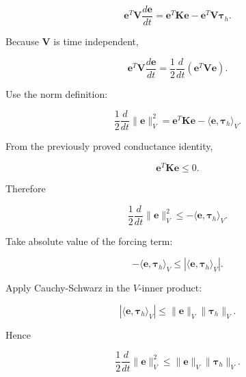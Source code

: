 \documentclass[11pt,a4paper]{article}
\begin{document}
\begin{equation}
\mathbf e^T\mathbf V
\frac{d\mathbf e}{dt}
=
\mathbf e^T\mathbf K\mathbf e
-
\mathbf e^T\mathbf V\boldsymbol\tau_h.
\tag{TRISO-ACC-272}
\label{eq:triso-acc-272}
\end{equation}

Because $\mathbf V$ is time independent,

\begin{equation}
\mathbf e^T\mathbf V
\frac{d\mathbf e}{dt}
=
\frac12
\frac{d}{dt}
\left(
\mathbf e^T\mathbf V\mathbf e
\right).
\tag{TRISO-ACC-273}
\label{eq:triso-acc-273}
\end{equation}

Use the norm definition:

\begin{equation}
\boxed{
\frac12
\frac{d}{dt}
\|\mathbf e\|_V^2
=
\mathbf e^T\mathbf K\mathbf e
-
\langle\mathbf e,\boldsymbol\tau_h\rangle_V.
}
\tag{TRISO-ACC-274}
\label{eq:triso-acc-274}
\end{equation}

From the previously proved conductance identity,

\begin{equation}
\mathbf e^T\mathbf K\mathbf e
\le0.
\tag{TRISO-ACC-275}
\label{eq:triso-acc-275}
\end{equation}

Therefore

\begin{equation}
\frac12
\frac{d}{dt}
\|\mathbf e\|_V^2
\le
-
\langle\mathbf e,\boldsymbol\tau_h\rangle_V.
\tag{TRISO-ACC-276}
\label{eq:triso-acc-276}
\end{equation}

Take absolute value of the forcing term:

\begin{equation}
-\langle\mathbf e,\boldsymbol\tau_h\rangle_V
\le
\left|
\langle\mathbf e,\boldsymbol\tau_h\rangle_V
\right|.
\tag{TRISO-ACC-277}
\label{eq:triso-acc-277}
\end{equation}

Apply Cauchy-Schwarz in the $V$-inner product:

\begin{equation}
\left|
\langle\mathbf e,\boldsymbol\tau_h\rangle_V
\right|
\le
\|\mathbf e\|_V
\|\boldsymbol\tau_h\|_V.
\tag{TRISO-ACC-278}
\label{eq:triso-acc-278}
\end{equation}

Hence

\begin{equation}
\frac12
\frac{d}{dt}
\|\mathbf e\|_V^2
\le
\|\mathbf e\|_V
\|\boldsymbol\tau_h\|_V.
\tag{TRISO-ACC-279}
\label{eq:triso-acc-279}
\end{equation}
\end{document}
